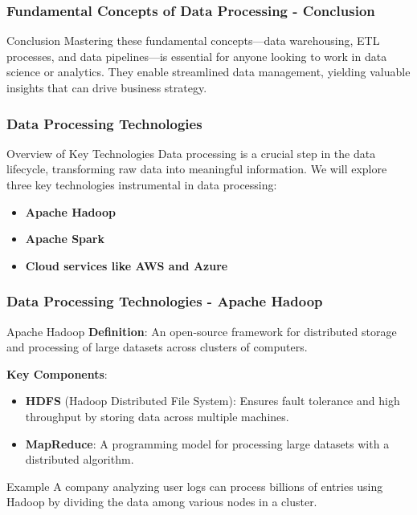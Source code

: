 \documentclass{beamer}
\begin{document}
\begin{frame}[fragile]
    \frametitle{Fundamental Concepts of Data Processing - Conclusion}
    \begin{block}{Conclusion}
        Mastering these fundamental concepts—data warehousing, ETL processes, and data pipelines—is essential for anyone looking to work in data science or analytics. They enable streamlined data management, yielding valuable insights that can drive business strategy.
    \end{block}
\end{frame}

\begin{frame}[fragile]
    \frametitle{Data Processing Technologies}
    \begin{block}{Overview of Key Technologies}
        Data processing is a crucial step in the data lifecycle, transforming raw data into meaningful information. 
        We will explore three key technologies instrumental in data processing:
        \begin{itemize}
            \item \textbf{Apache Hadoop}
            \item \textbf{Apache Spark}
            \item \textbf{Cloud services like AWS and Azure}
        \end{itemize}
    \end{block}
\end{frame}

\begin{frame}[fragile]
    \frametitle{Data Processing Technologies - Apache Hadoop}
    \begin{block}{Apache Hadoop}
        \textbf{Definition}: An open-source framework for distributed storage and processing of large datasets across clusters of computers.
        
        \textbf{Key Components}:
        \begin{itemize}
            \item \textbf{HDFS} (Hadoop Distributed File System): Ensures fault tolerance and high throughput by storing data across multiple machines.
            \item \textbf{MapReduce}: A programming model for processing large datasets with a distributed algorithm.
        \end{itemize}
    \end{block}
    
    \begin{block}{Example}
        A company analyzing user logs can process billions of entries using Hadoop by dividing the data among various nodes in a cluster.
    \end{block}
\end{frame}
\end{document}
